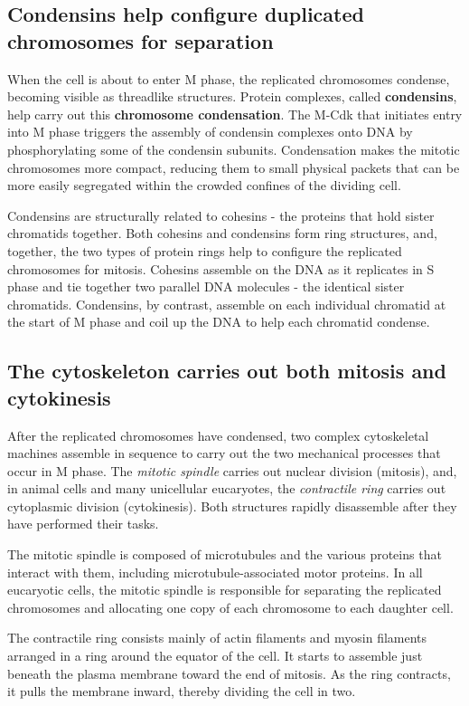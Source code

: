 \subsection{Condensins help configure duplicated chromosomes for separation}

When the cell is about to enter M phase, the replicated chromosomes
condense, becoming visible as threadlike structures. Protein complexes,
called \textbf{condensins}, help carry out this \textbf{chromosome condensation}. The
M-Cdk that initiates entry into M phase triggers the assembly of condensin
complexes onto DNA by phosphorylating some of the condensin
subunits. Condensation makes the mitotic chromosomes more compact,
reducing them to small physical packets that can be more easily segregated
within the crowded confines of the dividing cell.

Condensins are structurally related to cohesins - the proteins that hold
sister chromatids together. Both cohesins and condensins
form ring structures, and, together, the two types of protein
rings help to configure the replicated chromosomes for mitosis. Cohesins
assemble on the DNA as it replicates in S phase and tie together two
parallel DNA molecules - the identical sister chromatids. Condensins, by
contrast, assemble on each individual chromatid at the start of M phase
and coil up the DNA to help each chromatid condense.

\subsection{The cytoskeleton carries out both mitosis and cytokinesis}

After the replicated chromosomes have condensed, two complex cytoskeletal
machines assemble in sequence to carry out the two mechanical
processes that occur in M phase. The \textit{mitotic spindle} carries out nuclear
division (mitosis), and, in animal cells and many unicellular eucaryotes,
the \textit{contractile ring} carries out cytoplasmic division (cytokinesis).
Both structures rapidly disassemble after they have performed
their tasks.

The mitotic spindle is composed of microtubules and the various proteins
that interact with them, including microtubule-associated motor proteins.
In all eucaryotic cells, the mitotic spindle is
responsible for separating the replicated chromosomes and allocating
one copy of each chromosome to each daughter cell.

The contractile ring consists mainly of actin filaments and myosin filaments
arranged in a ring around the equator of the cell.
It starts to assemble just beneath the plasma membrane
toward the end of mitosis. As the ring contracts, it pulls the membrane
inward, thereby dividing the cell in two.

